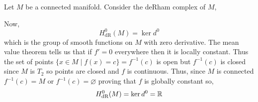 \documentclass[12pt]{extarticle}
\begin{document}
\begin{exercise}
Let $M$ be a connected manifold. Consider the deRham complex of $M$,
\begin{center}
\end{center}
Now,
\[ H^0_{\text{dR}}(M) = \ker{d^0} \]
which is the group of smooth functions on $M$ with zero derivative. The mean value theorem tells us that if $f' = 0$ everywhere then it is locally constant. Thus the set of points $\{ x \in M \mid f(x) = c \} = f^{-1}(c)$ is open but $f^{-1}(c)$ is closed since $M$ is $T_2$ so points are closed and $f$ is continuous. Thus, since $M$ is connected $f^{-1}(c) = M$ or $f^{-1}(c) = \varnothing$ proving that $f$ is globally constant so,
\[ H^0_{\text{dR}}(M) = \ker{d^0} = \mathbb{R} \]
\end{exercise}
\end{document}
